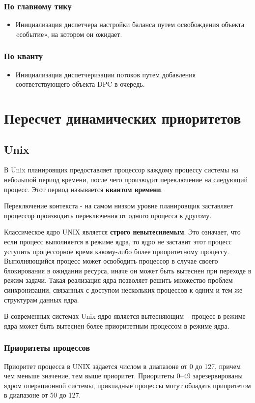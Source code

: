 \documentclass[12pt]{report}
\begin{document}
\subsection{По главному тику}
\begin{itemize}
	\item Инициализация диспетчера настройки баланса путем освобождения объекта «событие», на котором он ожидает.

\end{itemize}
\subsection{По кванту}
\begin{itemize}
	\item Инициализация диспетчеризации потоков путем добавления соответствующего объекта DPC в очередь.
\end{itemize}

\chapter{Пересчет динамических приоритетов}
\section{Unix}
В Unix планировщик предоставляет процессор каждому процессу системы на небольшой период времени, после чего производит переключение на следующий процесс. Этот период называется \textbf{квантом времени}.

Переключение контекста - на самом низком уровне планировщик заставляет процессор производить переключения от одного процесса к другому.

Классическое ядро UNIX является \textbf{строго невытесняемым}. Это означает, что если процесс выполняется в режиме ядра, то ядро не заставит этот процесс уступить процессорное время какому-либо более приоритетному процессу. Выполняющийся процесс может освободить процессор в случае своего блокирования в ожидании ресурса, иначе он может быть вытеснен при переходе в режим задачи. Такая реализация ядра позволяет решить множество проблем синхронизации, связанных с доступом нескольких процессов к одним и тем же структурам данных ядра.

В современных системах Unix ядро является вытесняющим – процесс в режиме ядра может быть вытеснен более приоритетным процессом в режиме ядра.

\subsection{Приоритеты процессов}
Приоритет процесса в UNIX задается числом в диапазоне от 0 до 127, причем чем меньше значение, тем выше приоритет. Приоритеты 0–49 зарезервированы ядром операционной системы, прикладные процессы могут обладать приоритетом в диапазоне от 50 до 127.
\end{document}
